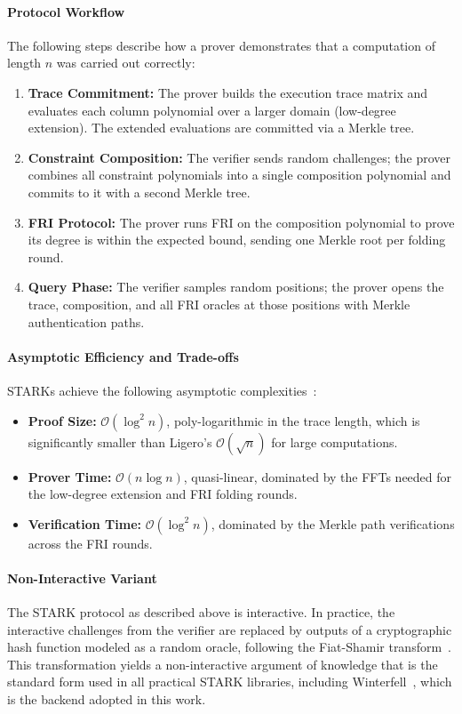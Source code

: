 \documentclass[binding=0.6cm,oneside,noexaminfo]{sapthesis}
\begin{document}
\paragraph{Protocol Workflow}
The following steps describe how a prover demonstrates that a computation of length $n$ was carried out correctly:
\begin{enumerate}
  \item \textbf{Trace Commitment:} The prover builds the execution trace matrix and evaluates each column
  polynomial over a larger domain (low-degree extension). The extended evaluations are committed via a Merkle tree.
  \item \textbf{Constraint Composition:} The verifier sends random challenges; the prover combines all
  constraint polynomials into a single composition polynomial and commits to it with a second Merkle tree.
  \item \textbf{FRI Protocol:} The prover runs FRI on the composition polynomial to prove its degree is
  within the expected bound, sending one Merkle root per folding round.
  \item \textbf{Query Phase:} The verifier samples random positions; the prover opens the trace, composition,
  and all FRI oracles at those positions with Merkle authentication paths.
\end{enumerate}

\paragraph{Asymptotic Efficiency and Trade-offs}
STARKs achieve the following asymptotic complexities~\cite{BenSasson2018STARK}:
\begin{itemize}
  \item \textbf{Proof Size:} $\mathcal{O}(\log^2 n)$, poly-logarithmic in the trace length, which is
  significantly smaller than Ligero's $\mathcal{O}(\sqrt{n})$ for large computations.
  \item \textbf{Prover Time:} $\mathcal{O}(n \log n)$, quasi-linear, dominated by the FFTs needed for the
  low-degree extension and FRI folding rounds.
  \item \textbf{Verification Time:} $\mathcal{O}(\log^2 n)$, dominated by the Merkle path verifications
  across the FRI rounds.
\end{itemize}

\paragraph{Non-Interactive Variant}
The STARK protocol as described above is interactive.
In practice, the interactive challenges from the verifier are replaced by outputs of a cryptographic hash
function modeled as a random oracle, following the Fiat-Shamir transform~\cite{FiatShamir1987}. This
transformation yields a non-interactive argument of knowledge that is the standard form used in all
practical STARK libraries, including Winterfell~\cite{FacebookWinterfell}, which is the backend adopted
in this work.
\end{document}
